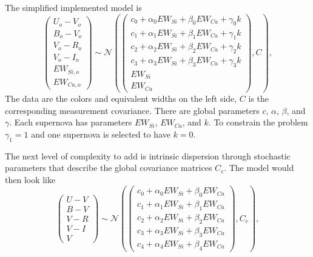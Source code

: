 \documentclass[11pt, oneside]{article}   	%
\begin{document}
The simplified implemented model is
\begin{equation}
\left(
\begin{matrix}
U_o-V_o\\B_o-V_o\\V_o-R_o\\V_o-I_o\\EW_{Si, o}\\ EW_{Ca, o}
\end{matrix}
\right) \sim \mathcal{N}
\left(
\left(
\begin{matrix}
c_0+\alpha_0 EW_{Si} + \beta_0 EW_{Ca} +\gamma_0 k  \\
c_1+\alpha_1 EW_{Si} + \beta_1 EW_{Ca}  +\gamma_1 k  \\
c_2+\alpha_2 EW_{Si} + \beta_2 EW_{Ca} +\gamma_2 k\\
c_3+\alpha_3 EW_{Si} + \beta_3 EW_{Ca} +\gamma_3 k\\
EW_{Si}\\ EW_{Ca}
\end{matrix}
\right)
,C
\right),
\end{equation}
The data are the colors and equivalent widths on the left side, $C$ is the corresponding measurement
covariance.  There are global parameters $c$, $\alpha$, $\beta$, and $\gamma$.  Each
supernova has parameters $EW_{Si}$, $EW_{Ca}$, and $k$.  To constrain the problem $\gamma_1=1$ and one supernova is selected to have
$k=0$.

The next level of complexity to add is intrinsic dispersion through stochastic parameters that describe the global  covariance matrices
$C_{c}$.  The model would then look like
\begin{equation}
\left(
\begin{matrix}
U-V\\B-V\\V-R\\V-I\\V
\end{matrix}
\right) \sim \mathcal{N}
\left(
\left(
\begin{matrix}
c_0+\alpha_0 EW_{Si} + \beta_0 EW_{Ca} \\
c_1+\alpha_1 EW_{Si} + \beta_1 EW_{Ca}  \\
c_2+\alpha_2 EW_{Si} + \beta_2 EW_{Ca} \\
c_3+\alpha_3 EW_{Si} + \beta_3 EW_{Ca} \\
c_4+\alpha_4 EW_{Si} + \beta_4 EW_{Ca}
\end{matrix}
\right)
,C_{c}
\right),
\end{equation}
\end{document}
